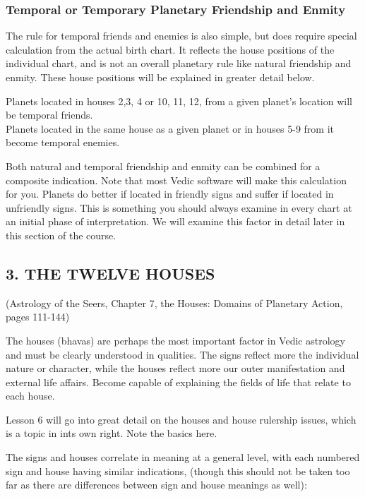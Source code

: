  

\subsubsection{Temporal or Temporary Planetary Friendship and Enmity}

 

The rule for temporal friends and enemies is also simple, but does require special calculation from the actual birth chart. It reflects the house positions of the individual chart, and is not an overall planetary rule like natural friendship and enmity. These house positions will be explained in greater detail below.

 

Planets located in houses 2,3, 4 or 10, 11, 12, from a given planet’s location will be temporal friends.\\
Planets located in the same house as a given planet or in houses 5-9 from it become temporal enemies.
 

Both natural and temporal friendship and enmity can be combined for a composite indication. Note that most Vedic software will make this calculation for you. Planets do better if located in friendly signs and suffer if located in unfriendly signs. This is something you should always examine in every chart at an initial phase of interpretation. We will examine this factor in detail later in this section of the course.

 

\subsection{3. THE TWELVE HOUSES} (Astrology of the Seers, Chapter 7, the Houses: Domains of Planetary Action, pages 111-144)


The houses (bhavas) are perhaps the most important factor in Vedic astrology and must be clearly understood in qualities. The signs reflect more the individual nature or character, while the houses reflect more our outer manifestation and external life affairs. Become capable of explaining the fields of life that relate to each house.

Lesson 6 will go into great detail on the houses and house rulership issues, which is a topic in ints own right. Note the basics here.

 

The signs and houses correlate in meaning at a general level, with each numbered sign and house having similar indications, (though this should not be taken too far as there are differences between sign and house meanings as well):

